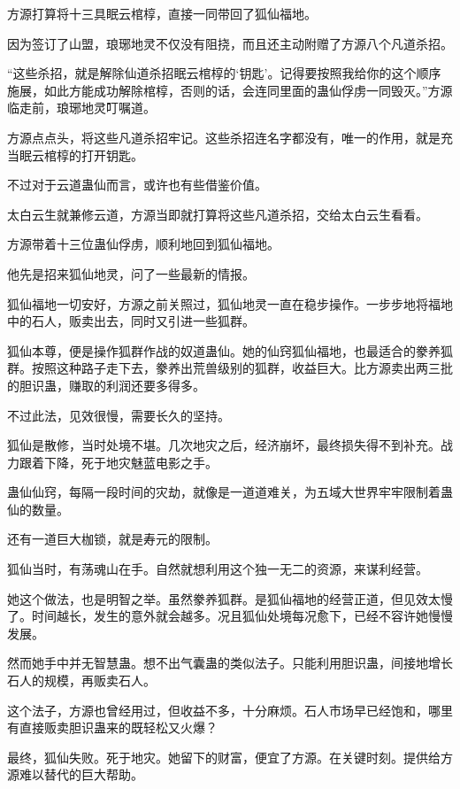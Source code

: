 
\begin{this_body}



方源打算将十三具眠云棺椁，直接一同带回了狐仙福地。

因为签订了山盟，琅琊地灵不仅没有阻挠，而且还主动附赠了方源八个凡道杀招。

“这些杀招，就是解除仙道杀招眠云棺椁的‘钥匙’。记得要按照我给你的这个顺序施展，如此方能成功解除棺椁，否则的话，会连同里面的蛊仙俘虏一同毁灭。”方源临走前，琅琊地灵叮嘱道。

方源点点头，将这些凡道杀招牢记。这些杀招连名字都没有，唯一的作用，就是充当眠云棺椁的打开钥匙。

不过对于云道蛊仙而言，或许也有些借鉴价值。

太白云生就兼修云道，方源当即就打算将这些凡道杀招，交给太白云生看看。

方源带着十三位蛊仙俘虏，顺利地回到狐仙福地。

他先是招来狐仙地灵，问了一些最新的情报。

狐仙福地一切安好，方源之前关照过，狐仙地灵一直在稳步操作。一步步地将福地中的石人，贩卖出去，同时又引进一些狐群。

狐仙本尊，便是操作狐群作战的奴道蛊仙。她的仙窍狐仙福地，也最适合的豢养狐群。按照这种路子走下去，豢养出荒兽级别的狐群，收益巨大。比方源卖出两三批的胆识蛊，赚取的利润还要多得多。

不过此法，见效很慢，需要长久的坚持。

狐仙是散修，当时处境不堪。几次地灾之后，经济崩坏，最终损失得不到补充。战力跟着下降，死于地灾魅蓝电影之手。

蛊仙仙窍，每隔一段时间的灾劫，就像是一道道难关，为五域大世界牢牢限制着蛊仙的数量。

还有一道巨大枷锁，就是寿元的限制。

狐仙当时，有荡魂山在手。自然就想利用这个独一无二的资源，来谋利经营。

她这个做法，也是明智之举。虽然豢养狐群。是狐仙福地的经营正道，但见效太慢了。时间越长，发生的意外就会越多。况且狐仙处境每况愈下，已经不容许她慢慢发展。

然而她手中并无智慧蛊。想不出气囊蛊的类似法子。只能利用胆识蛊，间接地增长石人的规模，再贩卖石人。

这个法子，方源也曾经用过，但收益不多，十分麻烦。石人市场早已经饱和，哪里有直接贩卖胆识蛊来的既轻松又火爆？

最终，狐仙失败。死于地灾。她留下的财富，便宜了方源。在关键时刻。提供给方源难以替代的巨大帮助。


\end{this_body}
